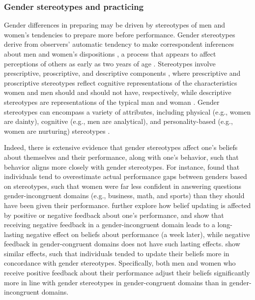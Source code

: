 \documentclass[letterpaper, nobind]{templates/ociamthesis}
\begin{document}
\hypertarget{gender-stereotypes-and-practicing}{%
\subsubsection{Gender stereotypes and practicing}\label{gender-stereotypes-and-practicing}}

Gender differences in preparing may be driven by stereotypes of men and women's tendencies to prepare more before performance. Gender stereotypes derive from observers' automatic tendency to make correspondent inferences about men and women's dispositions \autocite{Gilbert1995,Ross1977,Jones1967,Gawronski2004}, a process that appears to affect perceptions of others as early as two years of age \autocite{Poulin-Dubois2002,Serbin2002}. Stereotypes involve prescriptive, proscriptive, and descriptive components \autocite{Prentice2002}, where prescriptive and proscriptive stereotypes reflect cognitive representations of the characteristics women and men should and should not have, respectively, while descriptive stereotypes are representations of the typical man and woman \autocite{Burgess1999}. Gender stereotypes can encompass a variety of attributes, including physical (e.g., women are dainty), cognitive (e.g., men are analytical), and personality-based (e.g., women are nurturing) stereotypes \autocite{Cejka1999,Deaux1984}.

Indeed, there is extensive evidence that gender stereotypes affect one's beliefs about themselves and their performance, along with one's behavior, such that behavior aligns more closely with gender stereotypes. For instance, \textcite{Bordalo2019} found that individuals tend to overestimate actual performance gaps between genders based on stereotypes, such that women were far less confident in answering questions gender-incongruent domains (e.g., business, math, and sports) than they should have been given their performance. \textcite{Coffman2021} further explore how belief updating is affected by positive or negative feedback about one's performance, and show that receiving negative feedback in a gender-incongruent domain leads to a long-lasting negative effect on beliefs about performance (a week later), while negative feedback in gender-congruent domains does not have such lasting effects. \textcite{Coffman2019} show similar effects, such that individuals tended to update their beliefs more in concordance with gender stereotypes. Specifically, both men and women who receive positive feedback about their performance adjust their beliefs significantly more in line with gender stereotypes in gender-congruent domains than in gender-incongruent domains.
\end{document}

